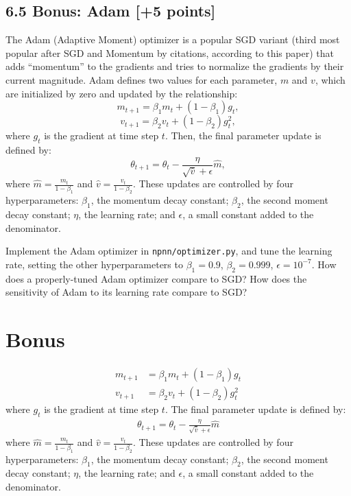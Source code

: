 \documentclass[a3paper,12pt]{extarticle} %
\begin{document}
\subsection*{6.5 Bonus: Adam [+5 points]}
The Adam (Adaptive Moment) optimizer is a popular SGD variant (third most popular after SGD and Momentum by citations, according to this paper) that adds “momentum” to the gradients and tries to normalize the gradients by their current magnitude. Adam defines two values for each parameter, $m$ and $v$, which are initialized by zero and updated by the relationship:
\[
m_{t+1} = \beta_1 m_t + (1 - \beta_1) g_t,
\]
\[
v_{t+1} = \beta_2 v_t + (1 - \beta_2) g_t^2,
\]
where $g_t$ is the gradient at time step $t$. Then, the final parameter update is defined by:
\[
\theta_{t+1} = \theta_t - \frac{\eta}{\sqrt{\hat{v}} + \epsilon} \hat{m},
\]
where $\hat{m} = \frac{m_t}{1 - \beta_1}$ and $\hat{v} = \frac{v_t}{1 - \beta_2}$. These updates are controlled by four hyperparameters: $\beta_1$, the momentum decay constant; $\beta_2$, the second moment decay constant; $\eta$, the learning rate; and $\epsilon$, a small constant added to the denominator.

Implement the Adam optimizer in \texttt{npnn/optimizer.py}, and tune the learning rate, setting the other hyperparameters to $\beta_1 = 0.9$, $\beta_2 = 0.999$, $\epsilon = 10^{-7}$. How does a properly-tuned Adam optimizer compare to SGD? How does the sensitivity of Adam to its learning rate compare to SGD?
\newpage
\section{Bonus}

\begin{align}
    m_{t+1} &= \beta_1 m_t + (1-\beta_1)g_t\\
    v_{t+1} &= \beta_2 v_t + (1-\beta_2)g_t^2
    \end{align}
    where $g_t$ is the gradient at time step $t$. The final parameter update is defined by:
    \begin{align}
    \theta_{t+1} = \theta_t - \frac{\eta}{\sqrt{\hat{v}} + \epsilon}\hat{m}
    \end{align}
    where $\hat{m} = \frac{m_t}{1-\beta_1}$ and $\hat{v} = \frac{v_t}{1-\beta_2}$. These updates are controlled by four hyperparameters: $\beta_1$, the momentum decay constant; $\beta_2$, the second moment decay constant; $\eta$, the learning rate; and $\epsilon$, a small constant added to the denominator.
\end{document}
